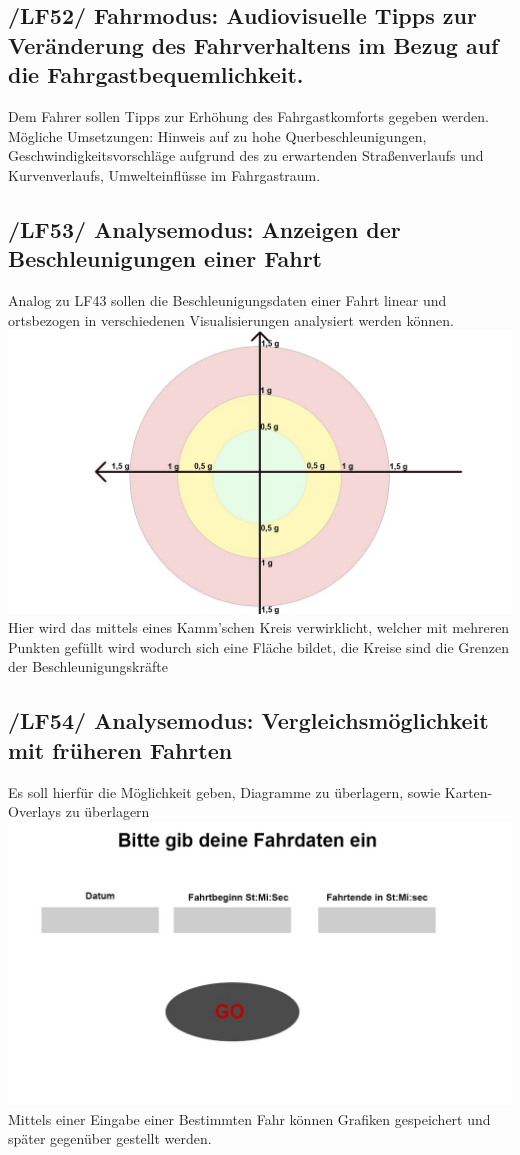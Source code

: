 \newpage
\subsection{/LF52/ Fahrmodus: Audiovisuelle Tipps zur Veränderung des Fahrverhaltens im Bezug auf die Fahrgastbequemlichkeit.}
\nextline
Dem Fahrer sollen Tipps zur Erhöhung des Fahrgastkomforts gegeben werden. Mögliche Umsetzungen: Hinweis auf zu hohe Querbeschleunigungen, Geschwindigkeitsvorschläge aufgrund des zu erwartenden Straßenverlaufs und Kurvenverlaufs, Umwelteinflüsse im Fahrgastraum.
\nextline
\subsection{/LF53/ Analysemodus: Anzeigen der Beschleunigungen einer Fahrt }
\nextline
Analog zu LF43 sollen die Beschleunigungsdaten einer Fahrt linear und ortsbezogen in verschiedenen Visualisierungen analysiert werden können.
\nextline
 \includegraphics[scale=0.3]{images/LF53_Kalm.jpg}
 \nextline
Hier wird das mittels eines Kamm'schen Kreis verwirklicht, welcher mit mehreren Punkten gefüllt wird wodurch sich eine Fläche bildet, die Kreise sind die Grenzen der Beschleunigungskräfte

\subsection{/LF54/ Analysemodus: Vergleichsmöglichkeit mit früheren Fahrten}
\nextline
Es soll hierfür die Möglichkeit geben, Diagramme zu überlagern, sowie Karten-Overlays zu überlagern 
\nextline
 \includegraphics[scale=0.3]{images/LF54_Fahrdaten.jpg}
 \nextline
Mittels einer Eingabe einer Bestimmten Fahr können Grafiken gespeichert und später gegenüber gestellt werden. 

